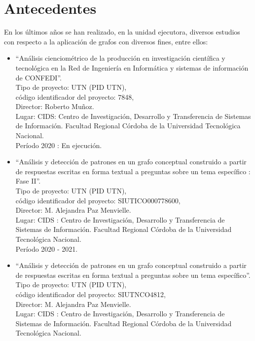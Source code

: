 \documentclass[
	11pt,oneside,a4paper,
	headsepline,footsepline,plainfootsepline,plainheadsepline,
	fleqn,
]{article}
\begin{document}
\section{Antecedentes}

En los últimos años se han realizado, en la unidad ejecutora, diversos estudios con respecto a la aplicación de grafos con diversos fines, entre ellos:

\begin{itemize}
	\item “Análisis cienciométrico de la producción en investigación científica y tecnológica en la Red de Ingeniería en Informática y sistemas de información de CONFEDI”. \\
	      Tipo de proyecto: UTN (PID UTN), \\
	      código identificador del proyecto: 7848, \\
	      Director: Roberto Muñoz. \\
	      Lugar: CIDS: Centro de Investigación, Desarrollo y Transferencia de Sistemas de Información. Facultad Regional Córdoba de la Universidad Tecnológica Nacional. \\
	      Período 2020 : En ejecución.
	\item “Análisis y detección de patrones en un grafo conceptual construido a partir de respuestas escritas en forma textual a preguntas sobre un tema específico : Fase II”. \\
	      Tipo de proyecto: UTN (PID UTN), \\
	      código identificador del proyecto: SIUTICO000778600, \\
	      Director: M. Alejandra Paz Menvielle. \\
	      Lugar: CIDS : Centro de Investigación, Desarrollo y Transferencia de Sistemas de Información. Facultad Regional Córdoba de la Universidad Tecnológica Nacional. \\
	      Período 2020 - 2021.
	\item “Análisis y detección de patrones en un grafo conceptual construido a partir de respuestas escritas en forma textual a preguntas sobre un tema específico”. \\
	      Tipo de proyecto: UTN (PID UTN), \\
	      código identificador del proyecto: SIUTNCO4812, \\
	      Director: M. Alejandra Paz Menvielle. \\
	      Lugar: CIDS : Centro de Investigación, Desarrollo y Transferencia de Sistemas de Información. Facultad Regional Córdoba de la Universidad Tecnológica Nacional. \\

\end{itemize}
\end{document}

